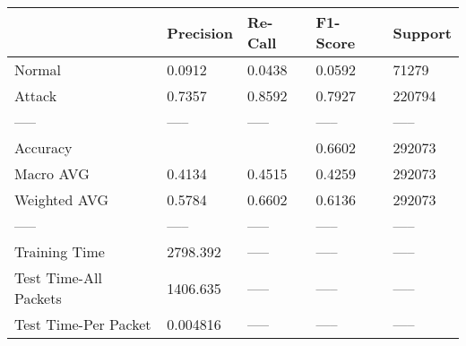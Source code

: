 \begin{tabular}{lllll}
\toprule
{} & Precision & Re-Call & F1-Score & Support \\
\midrule
Normal                &    0.0912 &  0.0438 &   0.0592 &   71279 \\
Attack                &    0.7357 &  0.8592 &   0.7927 &  220794 \\
-----                 &     ----- &   ----- &    ----- &   ----- \\
Accuracy              &           &         &   0.6602 &  292073 \\
Macro AVG             &    0.4134 &  0.4515 &   0.4259 &  292073 \\
Weighted AVG          &    0.5784 &  0.6602 &   0.6136 &  292073 \\
-----                 &     ----- &   ----- &    ----- &   ----- \\
Training Time         &  2798.392 &   ----- &    ----- &   ----- \\
Test Time-All Packets &  1406.635 &   ----- &    ----- &   ----- \\
Test Time-Per Packet  &  0.004816 &   ----- &    ----- &   ----- \\
\bottomrule
\end{tabular}
